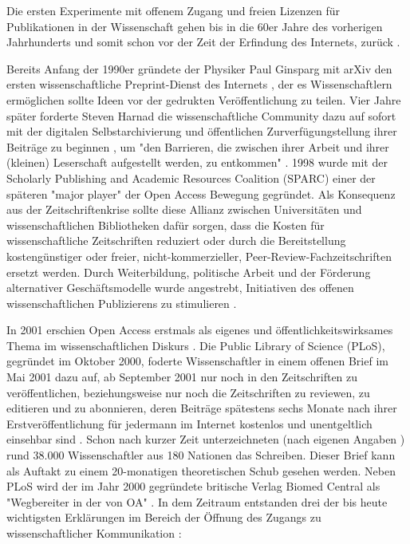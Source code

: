 Die ersten Experimente mit offenem Zugang und freien Lizenzen für Publikationen in der Wissenschaft gehen bis in die 60er Jahre des vorherigen Jahrhunderts und somit schon vor der Zeit der Erfindung des Internets, zurück \cite{cite:18b}. 

Bereits Anfang der 1990er gründete der Physiker Paul Ginsparg mit arXiv den ersten wissenschaftliche Preprint-Dienst des Internets \cite{suchen}, der es Wissenschaftlern ermöglichen sollte Ideen vor der gedrukten Veröffentlichung zu teilen. Vier Jahre später forderte Steven Harnad die wissenschaftliche Community dazu auf sofort mit der digitalen Selbstarchivierung und öffentlichen Zurverfügungstellung ihrer Beiträge zu beginnen \cite{albert_2006_open_implications}, um "den Barrieren, die zwischen ihrer Arbeit und ihrer (kleinen) Leserschaft aufgestellt werden, zu entkommen" \cite{harnad_1995_subversive_proposal}. 1998 wurde mit der Scholarly Publishing and Academic Resources Coalition (SPARC) einer der späteren "major player" der Open Access Bewegung\cite{russell2008business} \cite{Herb_2012} gegründet. Als Konsequenz aus der Zeitschriftenkrise sollte diese Allianz zwischen Universitäten und wissenschaftlichen Bibliotheken dafür sorgen, dass die Kosten für wissenschaftliche Zeitschriften reduziert oder durch die Bereitstellung kostengünstiger oder freier, nicht-kommerzieller, Peer-Review-Fachzeitschriften ersetzt werden. Durch Weiterbildung, politische Arbeit und der Förderung alternativer Geschäftsmodelle wurde angestrebt, Initiativen des offenen wissenschaftlichen Publizierens zu stimulieren \cite{suchen}.

In 2001 erschien Open Access erstmals als eigenes und öffentlichkeitswirksames Thema im wissenschaftlichen Diskurs \cite{cite:19}. Die Public Library of Science (PLoS), gegründet im Oktober 2000, foderte Wissenschaftler in einem offenen Brief im Mai 2001 dazu auf, ab September 2001 nur noch in den Zeitschriften zu veröffentlichen, beziehungsweise nur noch die Zeitschriften zu reviewen, zu editieren und zu abonnieren, deren Beiträge spätestens sechs Monate nach ihrer Erstveröffentlichung für jedermann im Internet kostenlos und unentgeltlich einsehbar sind \cite{cite:20}. Schon nach kurzer Zeit unterzeichneten (nach eigenen Angaben \cite{cite:19a}) rund 38.000 Wissenschaftler aus 180 Nationen das Schreiben. Dieser Brief kann als Auftakt zu einem 20-monatigen theoretischen Schub gesehen werden. Neben PLoS wird der im Jahr 2000 gegründete britische Verlag Biomed Central als "Wegbereiter in der von OA" \cite{suchen-Hoffmann-Zugang-undVerwertung-öffentlicher-Informationen}. In dem Zeitraum entstanden drei der bis heute wichtigsten Erklärungen im Bereich der Öffnung des Zugangs zu wissenschaftlicher Kommunikation \cite{CREATe_2014}: 


